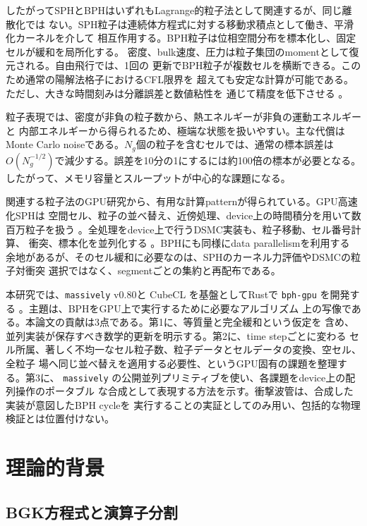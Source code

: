 \documentclass[a4paper,11pt]{ltjsarticle}
\newcommand{\bphgpu}{\texttt{bph-gpu}\xspace}
\newcommand{\massively}{\texttt{massively}\xspace}
\newcommand{\cubecl}{CubeCL\xspace}
\begin{document}
したがってSPHとBPHはいずれもLagrange的粒子法として関連するが、同じ離散化では
ない。SPH粒子は連続体方程式に対する移動求積点として働き、平滑化カーネルを介して
相互作用する。BPH粒子は位相空間分布を標本化し、固定セルが緩和を局所化する。
密度、bulk速度、圧力は粒子集団のmomentとして復元される。自由飛行では、1回の
更新でBPH粒子が複数セルを横断できる。このため通常の陽解法格子におけるCFL限界を
超えても安定な計算が可能である。ただし、大きな時間刻みは分離誤差と数値粘性を
通じて精度を低下させる \cite{isaka2006,murata2008}。

粒子表現では、密度が非負の粒子数から、熱エネルギーが非負の運動エネルギーと
内部エネルギーから得られるため、極端な状態を扱いやすい。主な代償はMonte Carlo
noiseである。$N_g$個の粒子を含むセルでは、通常の標本誤差は
$O(N_g^{-1/2})$で減少する。誤差を10分の1にするには約100倍の標本が必要となる。
したがって、メモリ容量とスループットが中心的な課題になる。

関連する粒子法のGPU研究から、有用な計算patternが得られている。GPU高速化SPHは
空間セル、粒子の並べ替え、近傍処理、device上の時間積分を用いて数百万粒子を扱う
\cite{crespo2011}。全処理をdevice上で行うDSMC実装も、粒子移動、セル番号計算、
衝突、標本化を並列化する \cite{su2012}。BPHにも同様にdata parallelismを利用する
余地があるが、そのセル緩和に必要なのは、SPHのカーネル力評価やDSMCの粒子対衝突
選択ではなく、segmentごとの集約と再配布である。

本研究では、\massively v0.80と \cubecl を基盤としてRustで \bphgpu を開発する
\cite{massively,cubecl}。主題は、BPHをGPU上で実行するために必要なアルゴリズム
上の写像である。本論文の貢献は3点である。第1に、等質量と完全緩和という仮定を
含め、並列実装が保存すべき数学的更新を明示する。第2に、time stepごとに変わる
セル所属、著しく不均一なセル粒子数、粒子データとセルデータの変換、空セル、全粒子
場へ同じ並べ替えを適用する必要性、というGPU固有の課題を整理する。第3に、
\massively の公開並列プリミティブを使い、各課題をdevice上の配列操作のポータブル
な合成として表現する方法を示す。衝撃波管は、合成した実装が意図したBPH cycleを
実行することの実証としてのみ用い、包括的な物理検証とは位置付けない。

\section{理論的背景}

\subsection{BGK方程式と演算子分割}
\end{document}
